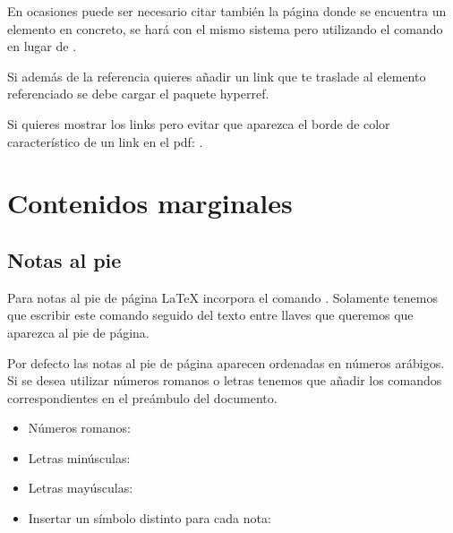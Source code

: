 \documentclass[11pt, a4paper]{article}
\begin{document}
En ocasiones puede ser necesario citar también la página donde se encuentra un elemento en concreto, se hará con el mismo sistema pero utilizando el comando  en lugar de .

Si además de la referencia quieres añadir un link que te traslade al elemento referenciado se debe cargar el paquete hyperref.

Si quieres mostrar los links pero evitar que aparezca el borde de color característico de un link en el pdf: .

\section{Contenidos marginales}

\subsection{Notas al pie}

Para notas al pie de página LaTeX incorpora el comando . Solamente tenemos que escribir este comando seguido del texto entre llaves que queremos que aparezca al pie de página.





	   
	       
Por defecto las notas al pie de página aparecen ordenadas en números arábigos. Si se desea utilizar números romanos o letras tenemos que añadir los comandos correspondientes en el preámbulo del documento.
\begin{itemize}
\item Números romanos: 

\item Letras minúsculas: 

\item Letras mayúsculas: 

\item Insertar un símbolo distinto para cada nota: 
\end{itemize}
\end{document}

